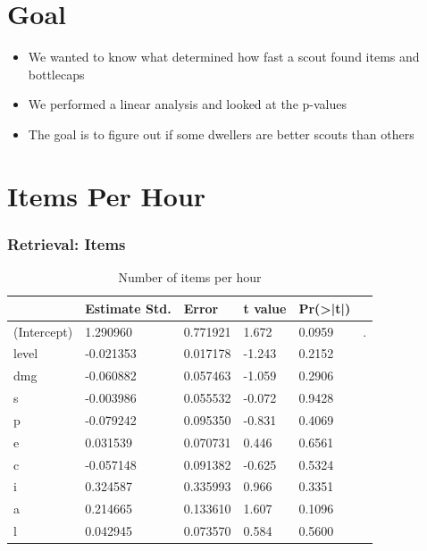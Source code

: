 \documentclass{beamer}
\begin{document}
\section{Goal}
\begin{frame}
  \begin{itemize}
  \item We wanted to know what determined how fast a scout found items and bottlecaps
  \item We performed a linear analysis and looked at the p-values
  \item The goal is to figure out if some dwellers are better scouts than others
  \end{itemize}

\end{frame}

\section{Items Per Hour}
\begin{frame}
  \frametitle{Retrieval: Items}
  \begin{table}
\caption{Number of items per hour}
\label{table:n.items}
\begin{tabular}{l|lllll}
&Estimate Std.&Error&t value&Pr(>|t|) &\\ 
\hline
(Intercept)&1.290960 &0.771921 &1.672&0.0959&.\\
level&-0.021353  & 0.017178 & -1.243 &  0.2152&  \\
dmg&-0.060882  & 0.057463 & -1.059 &  0.2906&  \\
s&-0.003986  & 0.055532 & -0.072  & 0.9428&  \\
p&-0.079242 &  0.095350 & -0.831 &  0.4069 & \\
e&0.031539 &  0.070731 &  0.446  & 0.6561&  \\
c& -0.057148  & 0.091382 & -0.625 &  0.5324&  \\
i&0.324587&0.335993&   0.966&   0.3351&  \\
a&0.214665&0.133610 &  1.607&   0.1096&  \\
l&0.042945&0.073570&0.584&0.5600&\\
\hline
\end{tabular}
\end{table}
\end{frame}
\end{document}

